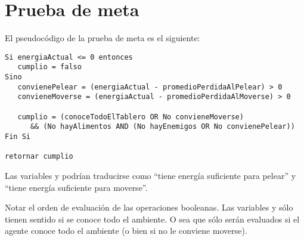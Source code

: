 \section{Prueba de meta}

El pseudocódigo de la prueba de meta es el siguiente:

\begin{verbatim}
Si energiaActual <= 0 entonces
   cumplio = falso
Sino
   convienePelear = (energiaActual - promedioPerdidaAlPelear) > 0
   convieneMoverse = (energiaActual - promedioPerdidaAlMoverse) > 0

   cumplio = (conoceTodoElTablero OR No convieneMoverse)
      && (No hayAlimentos AND (No hayEnemigos OR No convienePelear))
Fin Si

retornar cumplio
\end{verbatim}

Las variables  y  podrían
traducirse como ``tiene energía suficiente para pelear'' y ``tiene energía
suficiente para moverse''.

Notar el orden de evaluación de las operaciones booleanas. Las variables
 y  sólo tienen sentido si se conoce
todo el ambiente. O sea que sólo serán evaluados si el agente conoce todo el
ambiente (o bien si no le conviene moverse).


